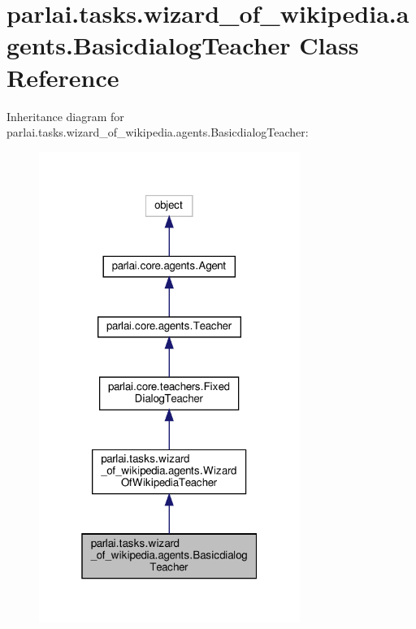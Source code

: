 \hypertarget{classparlai_1_1tasks_1_1wizard__of__wikipedia_1_1agents_1_1BasicdialogTeacher}{}\section{parlai.\+tasks.\+wizard\+\_\+of\+\_\+wikipedia.\+agents.\+Basicdialog\+Teacher Class Reference}
\label{classparlai_1_1tasks_1_1wizard__of__wikipedia_1_1agents_1_1BasicdialogTeacher}


Inheritance diagram for parlai.\+tasks.\+wizard\+\_\+of\+\_\+wikipedia.\+agents.\+Basicdialog\+Teacher\+:
\nopagebreak
\begin{figure}[H]
\begin{center}
\leavevmode
\includegraphics[width=241pt]{classparlai_1_1tasks_1_1wizard__of__wikipedia_1_1agents_1_1BasicdialogTeacher__inherit__graph}
\end{center}
\end{figure}


